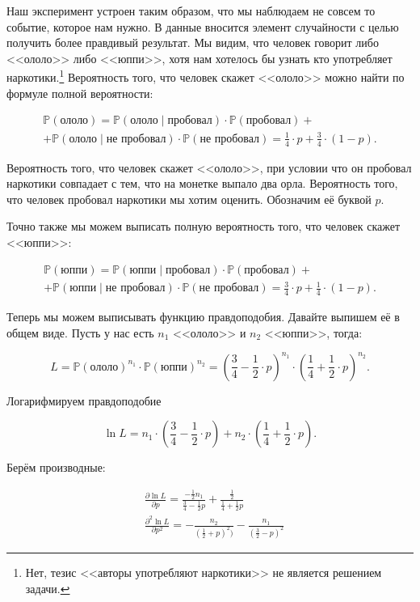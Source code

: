 \documentclass[12pt, a4paper, oneside]{extreport}
\def \mbb{\mathbb}
\def \PP{\mbb{P}}
\theoremstyle{plain}              %
\theoremstyle{definition}         %
\begin{document}
\begin{sol} 
	Наш эксперимент устроен таким образом, что мы наблюдаем не совсем то событие, которое нам нужно. В данные вносится элемент случайности с целью получить более правдивый результат. Мы видим, что человек говорит либо <<ололо>> либо <<юппи>>, хотя нам хотелось бы узнать кто употребляет наркотики.\footnote{Нет, тезис <<авторы употребляют наркотики>> не является решением задачи.} Вероятность того, что человек скажет <<ололо>> можно найти по формуле полной вероятности: 
	
	\begin{multline*}
	\PP(\text{ололо}) = \PP(\text{ололо} \mid \text{пробовал}) \cdot \PP(\text{пробовал}) + \\ + \PP(\text{ололо} \mid \text{не пробовал}) \cdot \PP(\text{не пробовал}) = \frac{1}{4} \cdot p + \frac{3}{4} \cdot (1-p).
	\end{multline*}
	
	Вероятность того, что человек скажет <<ололо>>, при условии что он пробовал наркотики совпадает с тем, что на монетке выпало два орла. Вероятность того, что человек пробовал наркотики мы хотим оценить. Обозначим её буквой $p$.  
	
	Точно также мы можем выписать полную вероятность того, что человек скажет <<юппи>>: 
	
	\begin{multline*}
	\PP(\text{юппи}) = \PP(\text{юппи} \mid \text{пробовал}) \cdot \PP(\text{пробовал}) + \\ + \PP(\text{юппи} \mid \text{не пробовал}) \cdot \PP(\text{не пробовал}) = \frac{3}{4} \cdot p + \frac{1}{4} \cdot (1-p).
	\end{multline*}
	
	Теперь мы можем выписывать функцию правдоподобия. Давайте выпишем её в общем виде. Пусть у нас есть $n_1$ <<ололо>> и $n_2$ <<юппи>>, тогда:
	
	\[
	L = \PP(\text{ололо})^{n_1} \cdot  \PP(\text{юппи})^{n_2} = \left( \frac{3}{4} - \frac{1}{2} \cdot p \right)^{n_1} \cdot \left( \frac{1}{4} + \frac{1}{2} \cdot p \right)^{n_2}.
	\]
	
	Логарифмируем правдоподобие 
	
	\[
	\ln L = n_1 \cdot \left( \frac{3}{4} - \frac{1}{2} \cdot p \right) + n_2 \cdot  \left( \frac{1}{4} + \frac{1}{2} \cdot p \right).
	\]

	Берём производные: 
	
	\begin{equation*}
	\begin{aligned}
	&\frac{\partial \ln L}{\partial p} = \frac{ - \frac{1}{2} n_1}{\frac{3}{4} - \frac{1}{2} p} + \frac{\frac{1}{2}}{\frac{1}{4} + \frac{1}{2}p}\\
	& \frac{\partial^2 \ln L}{\partial p^2} = -\frac{n_2}{(\frac{1}{2} + p)^2)} - \frac{n_1}{(\frac{3}{2} - p)^2}
	\end{aligned}
	\end{equation*}
	

\end{sol}
\end{document}
